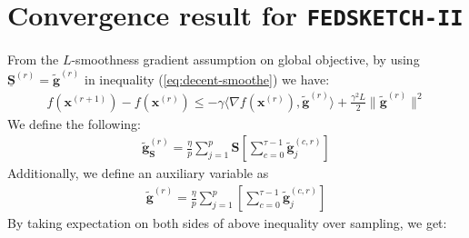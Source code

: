 \section{Convergence result for \texttt{FEDSKETCH-II}}
From the $L$-smoothness gradient assumption on global objective, by using  $\underline{\mathbf{S}}^{(r)}=\tilde{\mathbf{g}}^{(r)}$ in inequality (\ref{eq:decent-smoothe}) we have:
\begin{align}
    f({\boldsymbol{x}}^{(r+1)})-f({\boldsymbol{x}}^{(r)})\leq -\gamma \big\langle\nabla f({\boldsymbol{x}}^{(r)}),\tilde{\mathbf{g}}^{(r)}\big\rangle+\frac{\gamma^2 L}{2}\|\tilde{\mathbf{g}}^{(r)}\|^2\label{eq:Lipschitz-c1}
\end{align}
We define the following:
\begin{align}
    \tilde{\mathbf{g}}_{\mathbf{S}}^{(r)}=\frac{\eta}{p}\sum_{j=1}^{p}\mathbf{S}\left[\sum_{c=0}^{\tau-1}\tilde{\mathbf{g}}_j^{(c,r)}\right]
\end{align}
Additionally, we define an auxiliary variable as 
\begin{align}
    \tilde{\mathbf{g}}^{(r)}=\frac{\eta}{p}\sum_{j=1}^{p}\left[\sum_{c=0}^{\tau-1}\tilde{\mathbf{g}}_j^{(c,r)}\right]
\end{align}
By taking expectation on both sides of above inequality over sampling, we get:
